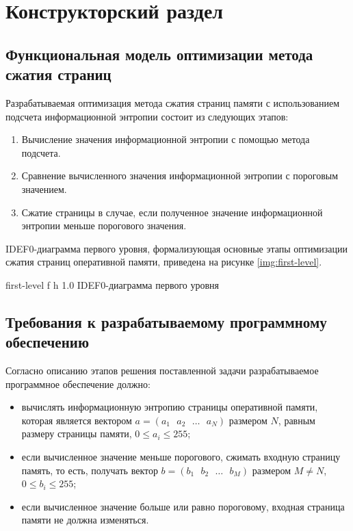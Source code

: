 \chapter{Конструкторский раздел}

\section{Функциональная модель оптимизации метода сжатия страниц}

Разрабатываемая оптимизация метода сжатия страниц памяти с использованием подсчета информационной энтропии состоит из следующих этапов:

\begin{enumerate}
	\item Вычисление значения информационной энтропии с помощью метода подсчета.
	\item Сравнение вычисленного значения информационной энтропии с пороговым значением.
	\item Сжатие страницы в случае, если полученное значение информационной энтропии меньше порогового значения.
\end{enumerate}

IDEF0-диаграмма первого уровня, формализующая основные этапы оптимизации сжатия страниц оперативной памяти, приведена на рисунке \ref{img:first-level}.
    
    {first-level}
    {f}
    {h}
    {1.0\textwidth}
    {IDEF0-диаграмма первого уровня}

\section{Требования к разрабатываемому программному обеспечению}

Согласно описанию этапов решения поставленной задачи разрабатываемое программное обеспечение должно:

\begin{itemize}
	\item вычислять информационную энтропию страницы оперативной памяти, которая является вектором $a = (a_1\text{ }a_2\text{ }\dotso\text{ }a_N)$ размером $N$, равным размеру страницы памяти, $0 \leq a_i \leq 255$;
	\item если вычисленное значение меньше порогового, сжимать входную страницу память, то есть, получать вектор $b = (b_1\text{ }b_2\text{ }\dotso\text{ }b_M)$ размером $M \neq N$, $0 \leq b_i \leq 255$;
	\item если вычисленное значение больше или равно пороговому, входная страница памяти не должна изменяться.
\end{itemize}

